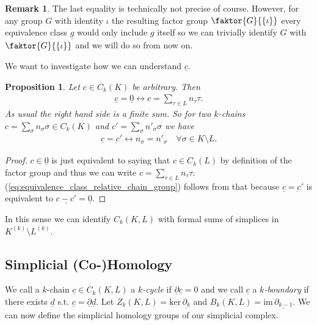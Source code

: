 \documentclass[12pt,a4paper]{article}
\numberwithin{equation}{subsection}
\numberwithin{lemma}{subsection}
\newtheorem{proposition}[lemma]{Proposition}
\theoremstyle{definition}
\newtheorem{remark}[lemma]{Remark}
\begin{document}
\begin{remark}
    The last equality is technically not precise of course. 
    However, for any group 
    $G$ with identity $\iota$ the resulting factor group
    $\faktor{G}{\{\iota\}}$ every equivalence class $\underline{g}$ would 
    only include $g$ itself so we can trivially identify $G$ with 
    $\faktor{G}{\{\iota\}}$ and we will do so from now on.
\end{remark}

We want to investigate how we can understand $\underline{c}$.

\begin{proposition}
    Let $c \in C_k(K)$ be arbitrary. Then
    \begin{align*}
        \underline{c} = \underline{0} 
        \leftrightarrow c = \sum\limits_{\tau \in L} n_\tau \tau.
    \end{align*}
    As usual the right hand side is a finite sum. 
    So for two $k$-chains $c = \sum_\sigma n_\sigma \sigma \in C_k(K)$ 
    and $c' =  \sum_\sigma n'_\sigma \sigma$ we have
    \begin{align}
        \underline{c} = \underbar{c}' 
        \leftrightarrow n_\sigma = n'_\sigma 
        \quad \forall \sigma \in K \setminus L. 
        \label{eq:equivalence_class_relative_chain_group}
    \end{align}
\end{proposition}
\begin{proof}
    $c \in \underline{0}$ is just equivalent to saying that 
    $c \in C_k(L)$ by definition of the factor group and thus we can write 
    $c = \sum\limits_{\tau \in L} n_\tau \tau$.
    (\ref{eq:equivalence_class_relative_chain_group}) follows from that 
    because $\underline{c} = \underbar{c}'$ is equivalent to
    $\underline{c - c'} = \underline{0}$.
\end{proof}

In this sense we can identify $C_k(K,L)$ with formal sums of 
simplices in $K^{(k)}\setminus L^{(k)}$. 

\subsection{Simplicial (Co-)Homology}

We call a $k$-chain $\underline{c} \in C_k(K,L)$ a \textit{$k$-cycle} if 
$\underline{\partial} \underline{c} = 0$ and we call $\underline{c}$ 
a \textit{$k$-boundary} if there exists $\underline{d}$ s.t. 
$\underline{c} = \underline{\partial} \underline{d}$. 
Let $Z_k(K,L) = \text{ker}\,\underline{\partial_k}$ 
and $B_k(K,L) = \text{im}\,\underline{\partial_{k-1}}$.
We can now define the simplicial homology groups of our simplicial complex.
\end{document}
